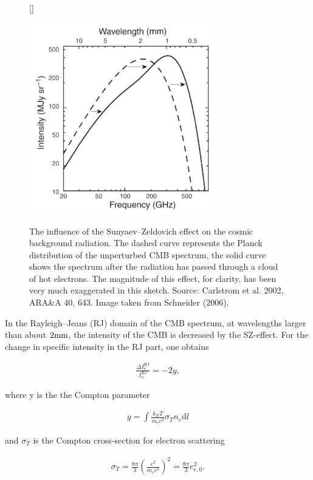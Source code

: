 \documentclass[a4paper,11pt]{article}
\begin{document}
\begin{figure}[h]
    [\FBwidth]
    {\caption{\footnotesize{The influence of the Sunyaev–Zeldovich effect on the cosmic background radiation. The dashed curve represents the Planck distribution of the unperturbed CMB spectrum, the solid curve shows the spectrum after the radiation has passed through a cloud of hot electrons. The magnitude of this effect, for clarity, has been very much exaggerated in this sketch. Source: Carlstrom et al. 2002, ARA\&A 40, 643. Image taken from Schneider (2006).}}
    \label{fig:szeffect}}
    {\includegraphics[width=8cm]{figures/SZeffect.png}}
\end{figure}

{\noindent}In the Rayleigh–Jeans (RJ) domain of the CMB spectrum, at wavelengths larger than about $2{\rm mm}$, the intensity of the CMB is decreased by the SZ-effect. For the change in specific intensity in the RJ part, one obtains

\begin{align*}
    \frac{\Delta I_\nu^\mathrm{RJ}}{I_\nu^\mathrm{RJ}} = -2y,
\end{align*}

{\noindent}where y is the the Compton parameter

\begin{align*}
    y = \int\frac{k_BT}{m_ec^2}\sigma_Tn_e\mathrm{d}l
\end{align*}

{\noindent}and $\sigma_T$ is the Compton cross-section for electron scattering

\begin{align*}
    \sigma_T = \frac{8\pi}{3}\left(\frac{e^2}{m_ec^2}\right)^2 = \frac{8\pi}{3}e_{e,0}^2.
\end{align*}
\end{document}
